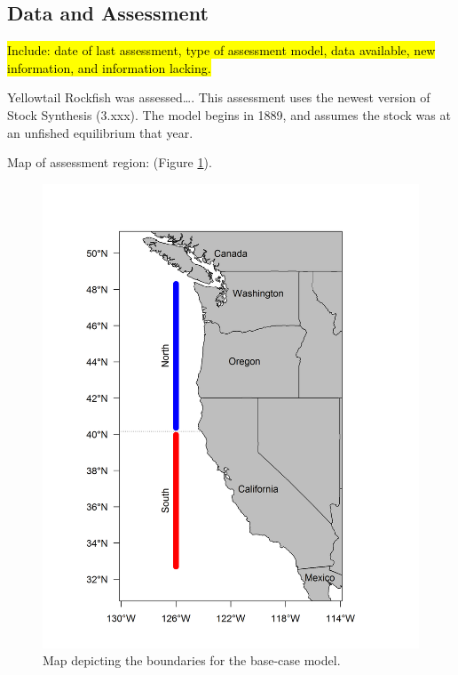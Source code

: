 \documentclass[12pt,]{article}
\begin{document}
\FloatBarrier

\newpage

\subsection*{Data and Assessment}\label{data-and-assessment}

\hl{Include: date of last assessment, type of assessment model, data available, new 
information, and information lacking.}

Yellowtail Rockfish was assessed\ldots{}. This assessment uses the
newest version of Stock Synthesis (3.xxx). The model begins in 1889, and
assumes the stock was at an unfished equilibrium that year.

Map of assessment region: (Figure \ref{fig:assess_region_map}).

\begin{figure}[htbp]
\centering
\includegraphics{Figures/assess_region_map.png}
\caption{Map depicting the boundaries for the base-case model.
\label{fig:assess_region_map}}
\end{figure}
\end{document}
